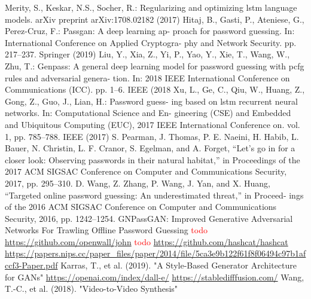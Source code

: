 \begin{thebibliography}
        Merity, S., Keskar, N.S., Socher, R.: Regularizing and optimizing lstm language
        models. arXiv preprint arXiv:1708.02182 (2017)
        \url{}
        Hitaj, B., Gasti, P., Ateniese, G., Perez-Cruz, F.: Passgan: A deep learning ap-
        proach for password guessing. In: International Conference on Applied Cryptogra-
        phy and Network Security. pp. 217–237. Springer (2019)
        \url{}
        Liu, Y., Xia, Z., Yi, P., Yao, Y., Xie, T., Wang, W., Zhu, T.: Genpass: A general
        deep learning model for password guessing with pcfg rules and adversarial genera-
        tion. In: 2018 IEEE International Conference on Communications (ICC). pp. 1–6.
        IEEE (2018
        \url{}
        Xu, L., Ge, C., Qiu, W., Huang, Z., Gong, Z., Guo, J., Lian, H.: Password guess-
        ing based on lstm recurrent neural networks. In: Computational Science and En-
        gineering (CSE) and Embedded and Ubiquitous Computing (EUC), 2017 IEEE
        International Conference on. vol. 1, pp. 785–788. IEEE (2017)
        \url{}
        S. Pearman, J. Thomas, P. E. Naeini, H. Habib, L. Bauer,
        N. Christin, L. F. Cranor, S. Egelman, and A. Forget, “Let’s go
        in for a closer look: Observing passwords in their natural habitat,”
        in Proceedings of the 2017 ACM SIGSAC Conference on Computer
        and Communications Security, 2017, pp. 295–310.
        \url{}
        D. Wang, Z. Zhang, P. Wang, J. Yan, and X. Huang, “Targeted
        online password guessing: An underestimated threat,” in Proceed-
        ings of the 2016 ACM SIGSAC Conference on Computer and
        Communications Security, 2016, pp. 1242–1254.
        \url{}
        GNPassGAN: Improved Generative Adversarial Networks For Trawling Offline Password Guessing
        \url{}
        \textcolor{red}{todo}
        \url{https://github.com/openwall/john}
        \textcolor{red}{todo}
        \url{https://github.com/hashcat/hashcat}
        \url{https://papers.nips.cc/paper_files/paper/2014/file/5ca3e9b122f61f8f06494c97b1afccf3-Paper.pdf}
        Karras, T., et al. (2019). "A Style-Based Generator Architecture for GANs"
        \url{}
        \url{https://openai.com/index/dall-e/}
        \url{https://stabledifffusion.com/}
        Wang, T.-C., et al. (2018). "Video-to-Video Synthesis"  
\end{thebibliography}
